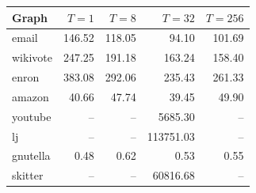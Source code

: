 \begin{tabular}{lrrrr}
\toprule
Graph & $T{=}1$ & $T{=}8$ & $T{=}32$ & $T{=}256$ \\
\midrule
email & 146.52 & 118.05 & 94.10 & 101.69 \\
wikivote & 247.25 & 191.18 & 163.24 & 158.40 \\
enron & 383.08 & 292.06 & 235.43 & 261.33 \\
amazon & 40.66 & 47.74 & 39.45 & 49.90 \\
youtube & -- & -- & 5685.30 & -- \\
lj & -- & -- & 113751.03 & -- \\
gnutella & 0.48 & 0.62 & 0.53 & 0.55 \\
skitter & -- & -- & 60816.68 & -- \\
\bottomrule
\end{tabular}
